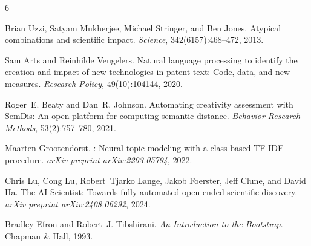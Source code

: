 \documentclass[11pt,a4paper]{article}
\begin{document}
\begin{thebibliography}{6}

Brian Uzzi, Satyam Mukherjee, Michael Stringer, and Ben Jones.
\newblock Atypical combinations and scientific impact.
\newblock \emph{Science}, 342(6157):468--472, 2013.

Sam Arts and Reinhilde Veugelers.
\newblock Natural language processing to identify the creation and impact of
  new technologies in patent text: Code, data, and new measures.
\newblock \emph{Research Policy}, 49(10):104144, 2020.

Roger~E. Beaty and Dan~R. Johnson.
\newblock Automating creativity assessment with {SemDis}: An open platform for
  computing semantic distance.
\newblock \emph{Behavior Research Methods}, 53(2):757--780, 2021.

Maarten Grootendorst.
: Neural topic modeling with a class-based {TF-IDF}
  procedure.
\newblock \emph{arXiv preprint arXiv:2203.05794}, 2022.

Chris Lu, Cong Lu, Robert~Tjarko Lange, Jakob Foerster, Jeff Clune, and
David Ha.
\newblock The {AI} {S}cientist: Towards fully automated open-ended scientific
  discovery.
\newblock \emph{arXiv preprint arXiv:2408.06292}, 2024.

Bradley Efron and Robert~J. Tibshirani.
\newblock \emph{An Introduction to the Bootstrap}.
\newblock Chapman \& Hall, 1993.

\end{thebibliography}
\end{document}
